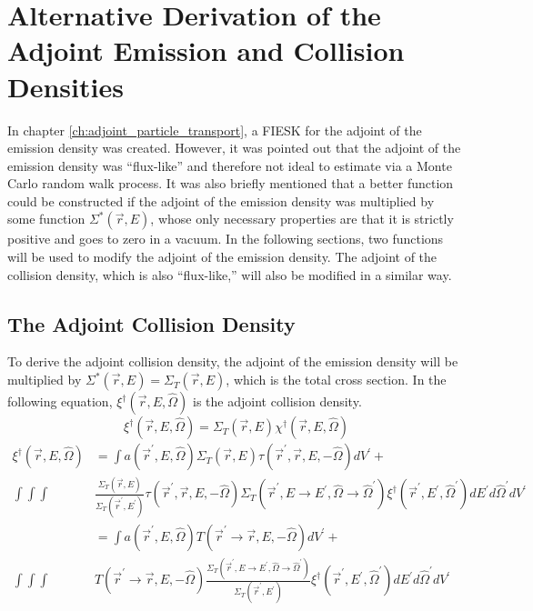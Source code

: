 \chapter{Alternative Derivation of the Adjoint Emission and Collision Densities}
\label{ch:appendix_a}

In chapter \ref{ch:adjoint_particle_transport}, a FIESK for the adjoint
of the emission density was created. However, it was pointed out that the 
adjoint of the emission density was ``flux-like'' and therefore not ideal to
estimate via a Monte Carlo random walk process. It was also briefly mentioned
that a better function could be constructed if the adjoint of the emission
density was multiplied by some function $\Sigma^{*}(\vec{r},E)$, whose only 
necessary properties are that it is strictly positive and goes to zero in a 
vacuum. In the following sections, two functions will be used to modify the 
adjoint of the emission density. The adjoint of the collision 
density, which is also ``flux-like,'' will also be modified in a similar way.

\section{The Adjoint Collision Density}
\label{sec:adjoint_collision_density}
To derive the adjoint collision density, the adjoint of the emission density
will be multiplied by $\Sigma^{*}(\vec{r},E) = \Sigma_T(\vec{r},E)$, which is 
the total cross section. In the following equation,
$\xi^{\dagger}(\vec{r},E,\hat{\Omega})$ is the adjoint collision density.
\begin{equation}
  \xi^{\dagger}(\vec{r},E,\hat{\Omega}) = \Sigma_T(\vec{r},E)
  \chi^{\dagger}(\vec{r},E,\hat{\Omega})
  \label{eq:adj_collision_dens_to_adjoint_of_emission_dens}
\end{equation}
\begin{align}
  \xi^{\dagger}(\vec{r},E,\hat{\Omega}) & = \int a(\vec{r}^{'},E,\hat{\Omega}) 
  \Sigma_T(\vec{r},E) \tau(\vec{r}^{'},\vec{r},E,-\hat{\Omega}) dV^{'} + 
  \nonumber \\
  \int\int\int  &\frac{\Sigma_T(\vec{r},E)}{\Sigma_T(\vec{r}^{'},E^{'})}
  \tau(\vec{r}^{'},\vec{r},E,-\hat{\Omega}) 
  \Sigma_T(\vec{r}^{'},E \to E^{'},\hat{\Omega} \to \hat{\Omega}^{'})
  \xi^{\dagger}(\vec{r}^{'},E^{'},\hat{\Omega}^{'}) dE^{'}d\hat{\Omega}^{'}dV^{'}
  \nonumber \\
  & = \int a(\vec{r}^{'},E,\hat{\Omega}) 
    T(\vec{r}^{'} \to \vec{r},E,-\hat{\Omega}) dV^{'} + \nonumber \\
    \int\int\int & T(\vec{r}^{'} \to \vec{r},E,-\hat{\Omega})
      \frac{\Sigma_T(\vec{r}^{'},E \to E^{'},\hat{\Omega} \to \hat{\Omega}^{'})}
           {\Sigma_T(\vec{r}^{'},E^{'})}
    \xi^{\dagger}(\vec{r}^{'},E^{'},\hat{\Omega}^{'}) dE^{'}d\hat{\Omega}^{'}dV^{'}
  \nonumber 
\end{align}

